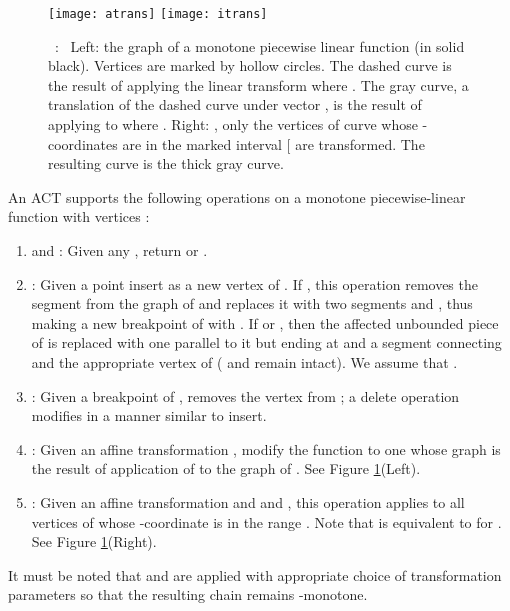 \documentclass[11pt]{article}
\newcommand\myCaption[1]{\small\refstepcounter{figure}\figurename\ \thefigure :\ #1}
\begin{document}
\begin{figure}
\begin{center}
\texttt{[image: atrans]}\qquad\qquad
\texttt{[image: itrans]}
\end{center}
\myCaption{\label{fig:trans} Left: the graph of a monotone piecewise 
linear function  (in solid black). Vertices are marked by hollow 
circles. The dashed curve is the result of applying the linear 
transform  where . 
The gray curve, a translation of the dashed curve under vector 
, is the 
result of applying  to  where . 
Right: , only the vertices of curve  
whose -coordinates are in the marked interval [ 
are transformed. The resulting curve is the thick gray curve. }
\end{figure}

An ACT supports the following operations on a monotone piecewise-linear
function  with vertices :
\begin{enumerate}
\item  and : Given any , return 
 or .

\item : Given a point  insert 
 as a new vertex of . If ,
this operation removes the segment  from the graph of 
 and replaces it with two segments  and , 
thus making  a new breakpoint of  with . 
If  or , then the affected unbounded piece of  is 
replaced with one parallel to it but ending at  and 
a segment connecting  and the appropriate vertex of  
( and  remain intact).  We assume that 
.

\item : Given a breakpoint  of , removes the vertex 
 from ; a delete operation modifies  in a 
manner similar to insert.

\item : Given an affine transformation 
, modify the 
function  to one whose graph is the result of application of 
 to the graph of . See Figure \ref{fig:trans}(Left).

\item : Given an affine transformation
 and  
and , this operation applies  to all vertices 
 of  whose -coordinate is in the range . Note that  is equivalent to  for . See Figure \ref{fig:trans}(Right).



\end{enumerate} 

It must be noted that  and  are applied 
with appropriate choice of transformation parameters so that the 
resulting chain remains -monotone.  
\end{document}
